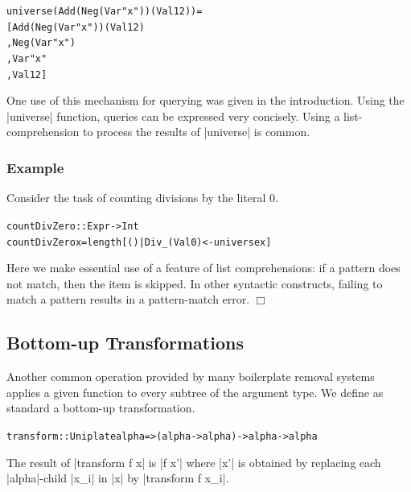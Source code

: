 \documentclass[preprint]{sigplanconf}
\newcounter{exmp}
\newcommand{\yesexample}{\refstepcounter{exmp}\subsubsection*{Example \arabic{exmp}}}
\newcommand{\noexample}{\hfill$\Box$}
\newenvironment{code}{\begin{alltt}\small}{\end{alltt}}
\newenvironment{example}{\yesexample}{\noexample}
\begin{document}
\begin{code}
universe (Add (Neg (Var "x")) (Val 12)) =
    [Add (Neg (Var "x")) (Val 12)
    ,Neg (Var "x")
    ,Var "x"
    ,Val 12]
\end{code}

One use of this mechanism for querying was given in the introduction. Using the |universe| function, queries can be expressed very concisely. Using a list-comprehension to process the results of |universe| is common.

\begin{example}
\label{ex:zerocount}
Consider the task of counting divisions by the literal 0.

\begin{code}
countDivZero :: Expr -> Int
countDivZero x = length [() | Div _ (Val 0) <- universe x]
\end{code}

Here we make essential use of a feature of list comprehensions: if a pattern does not match, then the item is skipped. In other syntactic constructs, failing to match a pattern results in a pattern-match error.
\end{example}

\subsection{Bottom-up Transformations}

Another common operation provided by many boilerplate removal systems \citep{lammel:syb,stratego,strafunski,ren:generic_recursion_toolbox} applies a given function to every subtree of the argument type. We define as standard a bottom-up transformation.

\begin{code}
transform :: Uniplate alpha => (alpha -> alpha) -> alpha -> alpha
\end{code}

The result of |transform f x| is |f x'| where |x'| is obtained by replacing each |alpha|-child |x_i| in |x| by |transform f x_i|.
\end{document}
